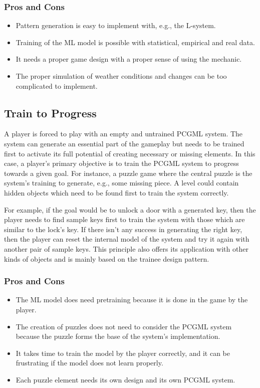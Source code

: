 \documentclass[MGS,Master,english]{twbook}%
\begin{document}
\subsubsection{Pros and Cons}
\begin{itemize}
	\item Pattern generation is easy to implement with, e.g., the L-system.
	\item Training of the \ac{ML} model is possible with statistical, empirical and real data.
	\item It needs a proper game design with a proper sense of using the mechanic.
	\item The proper simulation of weather conditions and changes can be too complicated to implement.
\end{itemize}


\subsection{Train to Progress} \label{idea::trainToProgress}
A player is forced to play with an empty and untrained \ac{PCGML} system. The system can generate an essential part of the gameplay but needs to be trained first to activate its full potential of creating necessary or missing elements. In this case, a player’s primary objective is to train the \ac{PCGML} system to progress towards a given goal. For instance, a puzzle game where the central puzzle is the system’s training to generate, e.g., some missing piece. A level could contain hidden objects which need to be found first to train the system correctly. 

For example, if the goal would be to unlock a door with a generated key, then the player needs to find sample keys first to train the system with those which are similar to the lock's key. If there isn’t any success in generating the right key, then the player can reset the internal model of the system and try it again with another pair of sample keys. This principle also offers its application with other kinds of objects and is mainly based on the trainee design pattern.

\subsubsection{Pros and Cons}
\begin{itemize}
	\item The \ac{ML} model does need pretraining because it is done in the game by the player.
	\item The creation of puzzles does not need to consider the \ac{PCGML} system because the puzzle forms the base of the system's implementation.
	\item It takes time to train the model by the player correctly, and it can be frustrating if the model does not learn properly.
	\item Each puzzle element needs its own design and its own \ac{PCGML} system.
\end{itemize}
\end{document}
